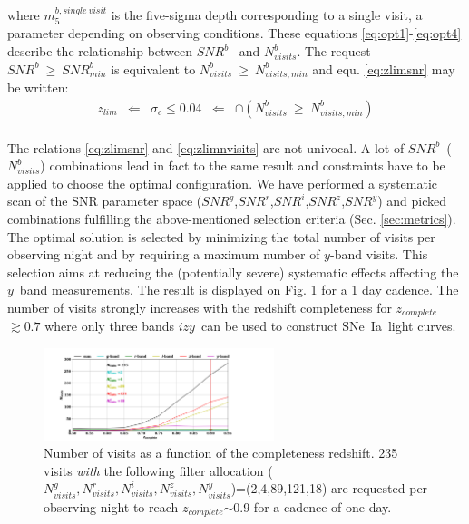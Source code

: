 \documentclass[skiphelvet,twocolumn]{aastex63}
\newcommand{\snrb}{\mbox{$SNR^b$}}
\newcommand{\snrbmin}{\mbox{$SNR^b_{min}$}}
\newcommand{\snrg}{\mbox{$SNR^g$}}
\newcommand{\snrr}{\mbox{$SNR^r$}}
\newcommand{\snri}{\mbox{$SNR^i$}}
\newcommand{\snrz}{\mbox{$SNR^z$}}
\newcommand{\snry}{\mbox{$SNR^y$}}
\newcommand{\bi}{{$i$}}
\newcommand{\bz}{{$z$}}
\newcommand{\by}{{$y$}}
\newcommand{\sigc}{\mbox{$\sigma_c$}}
\newcommand{\zlim}{\mbox{$z_{lim}$}}
\newcommand{\sne}{{SNe~Ia}}
\newcommand{\zcomp}{\mbox{$z_{complete}$}}
\newcommand{\seq}{$\sim$}
\newcommand{\nvisitsb}{\mbox{$N_{visits}^b$}}
\newcommand{\nvisitsbmin}{\mbox{$N_{visits,min}^b$}}
\newcommand{\nvisitsall}{$N_{visits}^g,N_{visits}^r,N_{visits}^i,N_{visits}^z,N_{visits}^y$}
\begin{document}
where $m_5^{b, single~visit}$ is the five-sigma depth corresponding to a single visit, a parameter depending on observing conditions. These equations \eqref{eq:opt1}-\eqref{eq:opt4} describe the relationship between \snrb~ and \nvisitsb. The request $\snrb~\geq~\snrbmin$ is equivalent to $\nvisitsb~\geq~\nvisitsbmin$ and equ. \eqref{eq:zlimsnr} may be written:
\begin{equation}
  \begin{aligned}
    \zlim &\Longleftarrow & \sigc \leq 0.04 & \Longleftarrow &\cap (\nvisitsb~\geq~\nvisitsbmin)
    \end{aligned}
 \label{eq:zlimnvisits}
\end{equation}
\\
The relations \eqref{eq:zlimsnr} and \eqref{eq:zlimnvisits} are not univocal. A lot of \snrb~(\nvisitsb) combinations lead in fact to the same result and constraints have to be applied to choose the optimal configuration. We have performed a systematic scan of the SNR parameter space (\snrg,\snrr,\snri,\snrz,\snry) and picked combinations fulfilling the above-mentioned selection criteria (Sec. \ref{sec:metrics}). The optimal solution is selected by minimizing the total number of visits per observing night and by requiring a maximum number of \by-band visits. This selection aims at reducing the (potentially severe) systematic effects affecting the \by~band measurements. The result is displayed on Fig. \ref{fig:nvisits_zlim} for a 1 day cadence. The number of visits strongly increases with the redshift completeness for \zcomp$\gtrsim 0.7$ where only three bands \bi\bz\by~can be used to construct \sne~light curves.

\begin{figure}[htbp]
\begin{center}
  \includegraphics[width=0.6\textwidth]{nvisits_zlim.png}
 \caption{Number of visits as a function of the completeness redshift. 235 visits {\it with} the following filter allocation (\nvisitsall)=(2,4,89,121,18) are requested per observing night to reach \zcomp\seq0.9 for a cadence of one day.}\label{fig:nvisits_zlim}
\end{center}
\end{figure}
\end{document}
